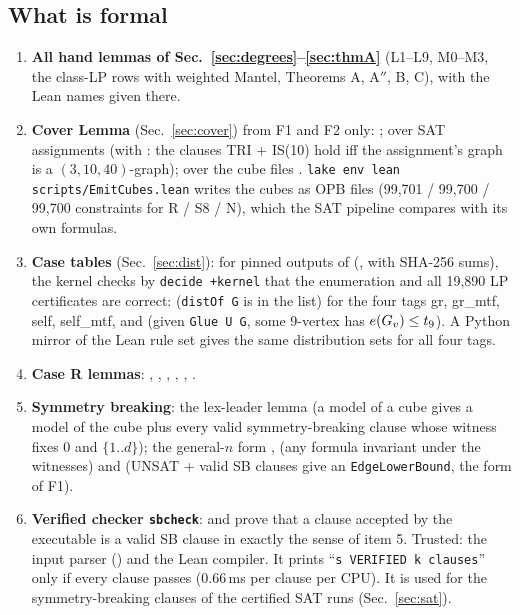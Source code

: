 \subsection{What is formal}\label{sec:lean-formal}
\begin{enumerate}
\item \textbf{All hand lemmas of Sec.~\ref{sec:degrees}--\ref{sec:thmA}} (L1--L9, M0--M3, the class-LP rows with weighted Mantel, Theorems A, A$''$,
   B, C), with the Lean names given there.
\item \textbf{Cover Lemma} (Sec.~\ref{sec:cover}) from F1 and F2 only: ; over SAT assignments 
   (with : the clauses TRI + IS(10) hold iff the assignment's graph is a $(3,10,40)$-graph);
   over the cube files . \texttt{lake env lean scripts/EmitCubes.lean} writes the cubes as OPB files
   (99,701 / 99,700 / 99,700 constraints for R / S8 / N), which the SAT pipeline compares with its own formulas.
\item \textbf{Case tables} (Sec.~\ref{sec:dist}): for pinned outputs of  (, with SHA-256 sums),
   the kernel checks by \texttt{decide +kernel} that the enumeration and all 19,890 LP certificates are correct:
    (\texttt{distOf G} is in the list) for the four tags gr, gr\_mtf, self, self\_mtf, and
    (given \texttt{Glue U G}, some 9-vertex has $e(G_{v}) \le t_9$). A Python mirror of the
   Lean rule set gives the same distribution sets for all four tags.
\item \textbf{Case R lemmas}: , , , , , .
\item \textbf{Symmetry breaking}: the lex-leader lemma  (a model of a cube gives a model of the cube
   plus every valid symmetry-breaking clause whose witness fixes 0 and $\{1..d\}$); the general-$n$ form
   ,  (any formula invariant under the witnesses) and
    (UNSAT + valid SB clauses give an \texttt{EdgeLowerBound}, the form of F1).
\item \textbf{Verified checker \texttt{sbcheck}}:  and  prove that a clause accepted by the
   executable is a valid SB clause in exactly the sense of item 5. Trusted: the input parser () and the
   Lean compiler. It prints ``\texttt{s VERIFIED k clauses}'' only if every clause passes (0.66\,ms per clause per CPU).
   It is used for the symmetry-breaking clauses of the certified SAT runs (Sec.~\ref{sec:sat}).
\end{enumerate}

